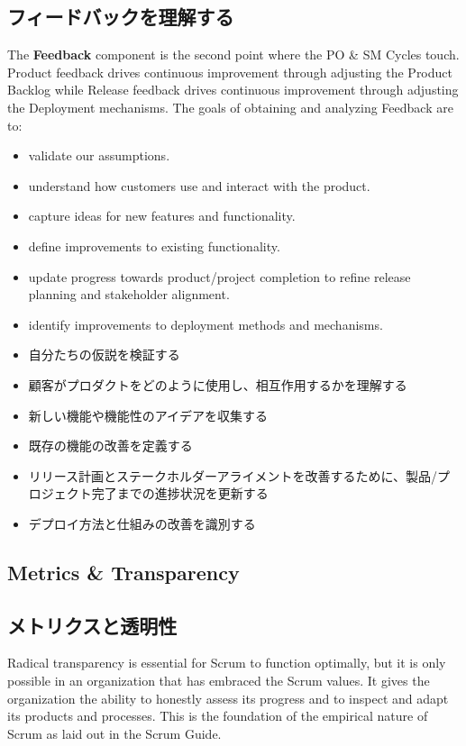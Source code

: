 \documentclass[12pt,a4paper,parskip=full]{scrartcl}
\begin{document}
\subsection{フィードバックを理解する}
The \textbf{Feedback} component is the second point where the PO \& SM
Cycles touch. Product feedback drives continuous improvement through
adjusting the Product Backlog while Release feedback drives continuous
improvement through adjusting the Deployment mechanisms. The goals of
obtaining and analyzing Feedback are to:
\begin{itemize}
\item validate our assumptions.
\item understand how customers use and interact with the product.
\item capture ideas for new features and functionality.
\item define improvements to existing functionality.
\item update progress towards product/project completion to refine release
planning and stakeholder alignment.
\item identify improvements to deployment methods and mechanisms.
\end{itemize}
\fi
\begin{itemize}
\item 自分たちの仮説を検証する
\item 顧客がプロダクトをどのように使用し、相互作用するかを理解する
\item 新しい機能や機能性のアイデアを収集する
\item 既存の機能の改善を定義する
\item リリース計画とステークホルダーアライメントを改善するために、製品/プロジェクト完了までの進捗状況を更新する
\item デプロイ方法と仕組みの改善を識別する
\end{itemize}

\subsection{Metrics \& Transparency}
\fi
\subsection{メトリクスと透明性}
Radical transparency is essential for Scrum to function optimally, but it
is only possible in an organization that has embraced the Scrum values. It
gives the organization the ability to honestly assess its progress and to
inspect and adapt its products and processes. This is the foundation of the
empirical nature of Scrum as laid out in the Scrum Guide.
\end{document}

